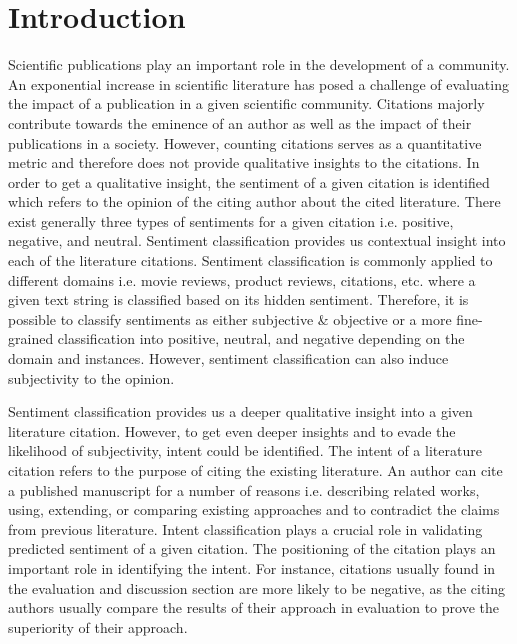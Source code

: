 \documentclass[runningheads]{llncs}
\begin{document}
\section{Introduction}
Scientific publications play an important role in the development of a community. An exponential increase in scientific literature has posed a challenge of evaluating the impact of a publication in a given scientific community. Citations majorly contribute towards the eminence of an author as well as the impact of their publications in a society. However, counting citations serves as a quantitative metric and therefore does not provide qualitative insights to the citations. In order to get a qualitative insight, the sentiment of a given citation is identified which refers to the opinion of the citing author about the cited literature. There exist generally three types of sentiments for a given citation i.e. positive, negative, and neutral. Sentiment classification provides us contextual insight into each of the literature citations. Sentiment classification is commonly applied to different domains \cite{bahrainian2013sentiment,wu2015sentiment,feldman2013techniques,lin2009joint,medhat2014sentiment} i.e. movie reviews, product reviews, citations, etc. where a given text string is classified based on its hidden sentiment. Therefore, it is possible to classify sentiments as either subjective \& objective or a more fine-grained classification into positive, neutral, and negative depending on the domain and instances. However, sentiment classification can also induce subjectivity to the opinion.

Sentiment classification provides us a deeper qualitative insight into a given literature citation. However, to get even deeper insights and to evade the likelihood of subjectivity, intent could be identified. The intent of a literature citation refers to the purpose of citing the existing literature. An author can cite a published manuscript for a number of reasons i.e. describing related works, using, extending, or comparing existing approaches and to contradict the claims from previous literature. Intent classification plays a crucial role in validating predicted sentiment of a given citation. The positioning of the citation plays an important role in identifying the intent. For instance, citations usually found in the evaluation and discussion section are more likely to be negative, as the citing authors usually compare the results of their approach in evaluation to prove the superiority of their approach. 
\end{document}
